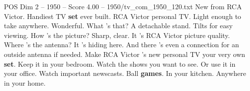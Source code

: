 \begin{textsample}{POS Dim 2 – 1950 – Score 4.00 – 1950/tv\_com\_1950\_120.txt}  \label{ex:f2_pos_008}
New from RCA Victor.
Handiest TV \textbf{set} ever built.
RCA Victor personal TV.
Light enough to take anywhere.
Wonderful.
What 's that?
A detachable stand.
Tilts for easy viewing.
How 's the picture?
Sharp, clear.
It 's RCA Victor picture quality.
Where 's the antenna?
It 's hiding here.
And there 's even a connection for an outside antenna if needed.
Make RCA Victor 's new personal TV your very own \textbf{set}.
Keep it in your bedroom.
Watch the shows you want to see.
Or use it in your office.
Watch important newscasts.
Ball \textbf{games}.
In your kitchen.
Anywhere in your home.

\end{textsample}
